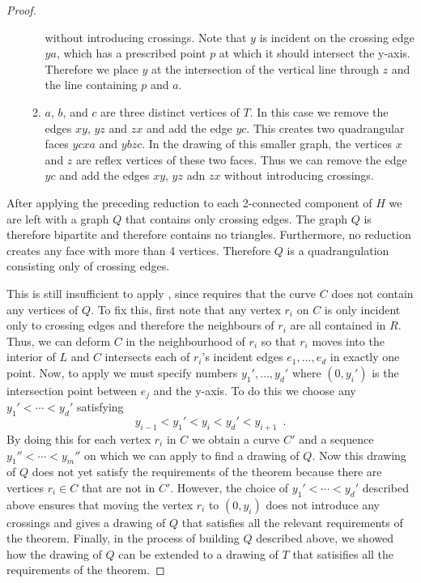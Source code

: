 \documentclass{patmorin}
\begin{document}
\begin{proof}
\begin{enumerate}
\begin{enumerate}
            without introducing crossings.  Note that $y$ is incident
            on the crossing edge $ya$, which has a prescribed point $p$
            at which it should intersect the y-axis.  Therefore we place
            $y$ at the intersection of the vertical line through $z$
            and the line containing $p$ and $a$.
          \item $a$, $b$, and $c$ are three distinct vertices of $T$.
            In this case we remove the edges $xy$, $yz$ and $zx$ and add
            the edge $yc$.  This creates two quadrangular faces $ycxa$
            and $ybzc$.  In the drawing of this smaller graph, the
            vertices $x$ and $z$ are reflex vertices of these two faces.
            Thus we can remove the edge $yc$ and add the edges $xy$,
            $yz$ adn $zx$ without introducing crossings.
      \end{enumerate}
   \end{enumerate}
   After applying the preceding reduction to each 2-connected component
   of $H$ we are left with a graph $Q$ that contains only crossing
   edges.  The graph $Q$ is therefore bipartite and therefore contains
   no triangles.  Furthermore, no reduction creates any face with more
   than 4 vertices. Therefore $Q$ is a quadrangulation consisting only
   of crossing edges.  

   This is still insufficient to apply , since 
   requires that the curve $C$ does not contain any vertices of $Q$.
   To fix this, first note that any vertex $r_i$ on $C$ is only incident
   only to crossing edges and therefore the neighbours of $r_i$ are all
   contained in $R$. Thus, we can deform $C$ in the neighbourhood of $r_i$
   so that $r_i$ moves into the interior of $L$ and $C$ intersects each
   of $r_i$'s incident edges $e_1,\ldots,e_d$ in exactly one point.  Now,
   to apply  we must specify numbers $y_1',\ldots,y_d'$ where
   $(0,y_i')$ is the intersection point between $e_j$ and the y-axis.
   To do this we choose any $y_1'<\cdots<y_d'$ satisfying
   \[
       y_{i-1} < y_1' < y_i < y_d' < y_{i+1} \enspace .
   \]
   By doing this for each vertex $r_i$ in $C$ we obtain a curve $C'$ and
   a sequence $y_1''<\cdots<y_m''$ on which we can apply  to
   find a drawing of $Q$.  Now this drawing of $Q$ does not yet satisfy
   the requirements of the theorem because there are vertices $r_i\in
   C$ that are not in $C'$. However, the choice of $y_1'<\cdots<y_d'$
   described above ensures that moving the vertex $r_i$ to $(0,y_i)$
   does not introduce any crossings and gives a drawing of $Q$ that
   satisfies all the relevant requirements of the theorem.  Finally,
   in the process of building $Q$ described above, we showed how the
   drawing of $Q$ can be extended to a drawing of $T$ that satisifies
   all the requirements of the theorem.
\end{proof}
\end{document}
